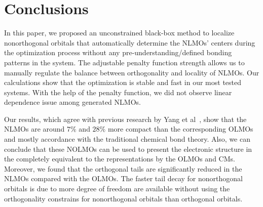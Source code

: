 \documentclass[aps,prl,reprint,amsmath,amssymb]{revtex4-1}
\begin{document}



\section{Conclusions}
In this paper, we proposed an unconstrained black-box method to localize nonorthogonal orbitals that automatically determine the NLMOs' centers during the optimization process without any pre-understanding/defined bonding patterns in the system. 
The adjustable penalty function strength allows us to manually regulate the balance between orthogonality and locality of NLMOs.
Our calculations show that the optimization is stable and fast in our most tested systems.
With the help of the penalty function, we did not observe linear dependence issue among generated NLMOs.

Our results, which agree with previous research by Yang et al~\cite{feng2004An_efficient, cui2010efficient}, show that the NLMOs are around $7\%$ and $28\%$ more compact than the corresponding OLMOs and mostly accordance with the traditional chemical bond theory.
Also, we  can conclude that these NOLMOs can be used to present the electronic structure in the completely equivalent to the representations by the OLMOs and CMs.
Moreover, we found that the orthogonal tails are significantly reduced in the NLMOs compared with the OLMOs.
The faster tail decay for nonorthogonal orbitals is due to more degree of freedom are available without using the orthogonality constrains for nonorthogonal orbitals than orthogonal orbitals.
\end{document}
